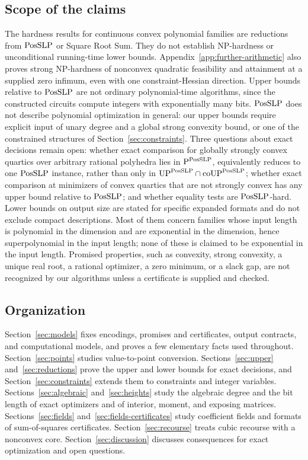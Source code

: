 \subsection{Scope of the claims}
\label{sec:intro-scope}

The hardness results for continuous convex polynomial families are reductions
from $\mathrm{PosSLP}$ or Square Root Sum. They do not establish NP-hardness or
unconditional running-time lower bounds. Appendix~\ref{app:further-arithmetic}
also proves strong NP-hardness of nonconvex quadratic feasibility and
attainment at a supplied zero infimum, even with one constraint-Hessian
direction. Upper bounds relative to $\mathrm{PosSLP}$ are not
ordinary polynomial-time algorithms, since the constructed circuits compute
integers with exponentially many bits. $\mathrm{PosSLP}$ does not describe polynomial
optimization in general: our upper bounds require explicit input of unary
degree and a global strong convexity bound, or one of the constrained
structures of Section~\ref{sec:constraints}. Three questions about exact
decisions remain open: whether exact comparison for globally strongly convex
quartics over arbitrary rational polyhedra lies in $\mathrm P^{\mathrm{PosSLP}}$,
equivalently reduces to one $\mathrm{PosSLP}$ instance, rather than only in
$\mathrm{UP}^{\mathrm{PosSLP}}\cap\mathrm{coUP}^{\mathrm{PosSLP}}$; whether exact comparison
at minimizers of convex quartics that are not strongly convex has any upper
bound relative to $\mathrm{PosSLP}$; and whether equality tests are $\mathrm{PosSLP}$-hard.
Lower bounds on output size are stated for specific expanded formats and do
not exclude compact descriptions. Most of them concern families whose input
length is polynomial in the dimension and are exponential in the dimension,
hence superpolynomial in the input length; none of these is claimed to be
exponential in the input length. Promised properties, such as convexity,
strong convexity, a unique real root, a rational optimizer, a zero minimum,
or a slack gap, are not recognized by our algorithms unless a certificate is
supplied and checked.

\subsection{Organization}
\label{sec:intro-organization}

Section~\ref{sec:models} fixes encodings, promises and certificates, output
contracts, and computational models, and proves a few elementary facts used
throughout. Section~\ref{sec:points} studies value-to-point conversion.
Sections~\ref{sec:upper} and~\ref{sec:reductions} prove the upper and lower
bounds for exact decisions, and Section~\ref{sec:constraints} extends them to
constraints and integer variables. Sections~\ref{sec:algebraic}
and~\ref{sec:heights} study the algebraic degree and the bit length of exact
optimizers and of interior, moment, and exposing matrices.
Sections~\ref{sec:fields} and~\ref{sec:fields-certificates} study
coefficient fields and formats of sum-of-squares certificates.
Section~\ref{sec:recourse} treats cubic recourse with a nonconvex core.
Section~\ref{sec:discussion} discusses consequences for exact optimization
and open questions.

